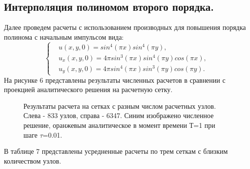 \documentclass[14pt]{article}
\begin{document}
\subsection{Интерполяция полиномом второго порядка.}
Далее проведем расчеты с использованием производных для повышения порядка полинома с начальным импульсом вида:
\begin{equation}
\left\lbrace
\begin{aligned}
&u(x,y,0) = sin^4(\pi x)sin^4(\pi y),\\
&u_x(x,y,0) =  4\pi sin^3(\pi x) sin^4(\pi y)  cos(\pi x),\\
&u_y(x,y,0) = 4\pi sin^4(\pi x)sin^3(\pi y)cos(\pi y).
\end{aligned}
\right .
\end{equation}
На рисунке 6 представлены результаты численных расчетов в сравнении с проекцией аналитического решения на расчетную сетку.
\begin{figure}[!h!]
\caption{Результаты расчета на сетках с разным числом расчетных узлов. Слева - 833 узлов, справа - 6347. Синим изображено численное решение, оранжевым аналитическое в момент времени Т=1 при шаге $\tau$=0.01.}
\end{figure}
 В таблице 7 представлены усредненные расчеты по трем сеткам с близким количеством узлов.
\end{document}
